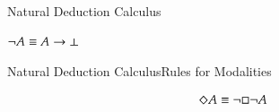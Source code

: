 \begin{frame}[shrink]{Natural Deduction Calculus}

\begin{unnamedCalculus}

\vspace{1em}

\s\s
{}
\s\s
{}
\s\s
{}

\vspace{2em}

\s\s
{}
\s\s
{}
\s\s
{}

\vspace{2em}

\s\s
{}
\s\s
{}
\s\s
{}

\vspace{2em}

\s
{}
\s
{}
\s\s
{}
\s
{}

\vspace{1em}

\s\s\s\s
$\neg A \equiv A \rightarrow \bot$ 
\s\s\s 
\alert{}

\vspace{1em}

\end{unnamedCalculus}

\end{frame}



\begin{frame}[shrink]{Natural Deduction Calculus}{Rules for Modalities}

\begin{unnamedCalculus}

\vspace{1em}

\s\s\s\s
{}
\s\s\s\s\s
{}

\vspace{2em}

\s\s\s\s
{}
\s\s\s\s\s
{}

\vspace{2em}

\alert{$$\Diamond A \equiv \neg \Box \neg A$$}

\vspace{1em}

\end{unnamedCalculus}

\end{frame}


